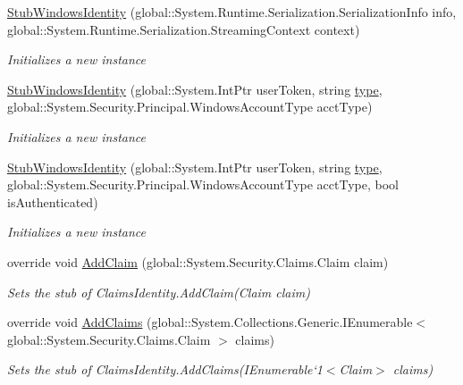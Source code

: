 \begin{DoxyCompactItemize}
\hyperlink{class_system_1_1_security_1_1_principal_1_1_fakes_1_1_stub_windows_identity_aee07a51cc3ff247b09098212e9aac8dd}{Stub\-Windows\-Identity} (global\-::\-System.\-Runtime.\-Serialization.\-Serialization\-Info info, global\-::\-System.\-Runtime.\-Serialization.\-Streaming\-Context context)
\begin{DoxyCompactList}\small\item\em Initializes a new instance\end{DoxyCompactList}\item 
\hyperlink{class_system_1_1_security_1_1_principal_1_1_fakes_1_1_stub_windows_identity_a84a25bf32469e260d47da39bf0184282}{Stub\-Windows\-Identity} (global\-::\-System.\-Int\-Ptr user\-Token, string \hyperlink{jquery-1_810_82-vsdoc_8js_a3940565e83a9bfd10d95ffd27536da91}{type}, global\-::\-System.\-Security.\-Principal.\-Windows\-Account\-Type acct\-Type)
\begin{DoxyCompactList}\small\item\em Initializes a new instance\end{DoxyCompactList}\item 
\hyperlink{class_system_1_1_security_1_1_principal_1_1_fakes_1_1_stub_windows_identity_aa3b9709025dcf09b402840124ab6a6d5}{Stub\-Windows\-Identity} (global\-::\-System.\-Int\-Ptr user\-Token, string \hyperlink{jquery-1_810_82-vsdoc_8js_a3940565e83a9bfd10d95ffd27536da91}{type}, global\-::\-System.\-Security.\-Principal.\-Windows\-Account\-Type acct\-Type, bool is\-Authenticated)
\begin{DoxyCompactList}\small\item\em Initializes a new instance\end{DoxyCompactList}\item 
override void \hyperlink{class_system_1_1_security_1_1_principal_1_1_fakes_1_1_stub_windows_identity_a7b774acf8e5b8ab25cbad9c12282f5ef}{Add\-Claim} (global\-::\-System.\-Security.\-Claims.\-Claim claim)
\begin{DoxyCompactList}\small\item\em Sets the stub of Claims\-Identity.\-Add\-Claim(\-Claim claim)\end{DoxyCompactList}\item 
override void \hyperlink{class_system_1_1_security_1_1_principal_1_1_fakes_1_1_stub_windows_identity_aaa7a309948c7a812df1871122b44745a}{Add\-Claims} (global\-::\-System.\-Collections.\-Generic.\-I\-Enumerable$<$ global\-::\-System.\-Security.\-Claims.\-Claim $>$ claims)
\begin{DoxyCompactList}\small\item\em Sets the stub of Claims\-Identity.\-Add\-Claims(I\-Enumerable`1$<$Claim$>$ claims)\end{DoxyCompactList}\item 

\end{DoxyCompactItemize}
